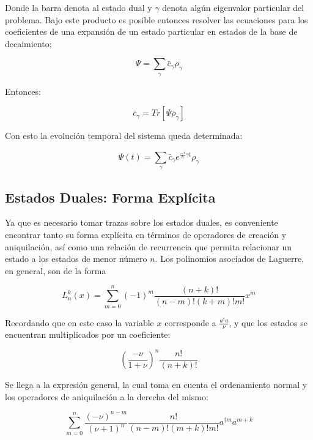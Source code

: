 \documentclass[a4paper,10pt]{report}
\begin{document}
Donde la barra denota al estado dual y $\gamma$ denota algún eigenvalor particular del problema. Bajo este producto es posible entonces resolver las ecuaciones para los coeficientes de una expansión de un estado particular en estados de la base de decaimiento:

\begin{equation}
\Psi = \sum_{\gamma}\bar{c}_\gamma \rho_\gamma
\end{equation}

Entonces:

\begin{equation}
\bar{c}_\gamma = Tr[\Psi\bar{\rho}_{\gamma}]
\end{equation}

Con esto la evolución temporal del sistema queda determinada:

\begin{equation}
\Psi(t) = \sum_\gamma \bar{c}_\gamma e^{\frac{-i}{\hbar} \gamma t} \rho_{\gamma}
\end{equation}

\subsection{Estados Duales: Forma Explícita}

Ya que es necesario tomar trazas sobre los estados duales, es conveniente encontrar tanto su forma explícita en términos de operadores de creación y aniquilación, así como una relación de recurrencia que permita relacionar un estado a los estados de menor número $n$. Los polinomios asociados de Laguerre, en general, son de la forma\cite{ArfkenMM}

\begin{equation}\label{DefLaguerre}
L_n^k(x) = \sum_{m=0}^n (-1)^m \frac{(n+k)!}{(n-m)!(k+m)!m!} x^m
\end{equation}

Recordando que en este caso la variable $x$ corresponde a $\frac{a^\dagger a}{\nu}$, y que los estados se encuentran multiplicados por un coeficiente:

\begin{equation}
(\frac{-\nu}{1+\nu})^n \frac{n!}{(n+k)!}
\end{equation}

Se llega a la expresión general, la cual toma en cuenta el ordenamiento normal y los operadores de aniquilación a la derecha del mismo:

\begin{equation}\label{DefDual}
\sum_{m=0}^n \frac{(-\nu)^{n-m}}{(\nu+1)^n} \frac{n!}{(n-m)!(m+k)!m!} a^{\dagger m}a^{m+k}
\end{equation}
\end{document}
